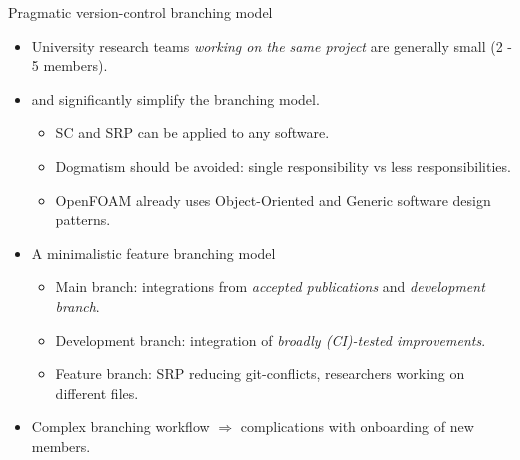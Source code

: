 \documentclass[
	ngerman,%
	aspectratio=169,%
	color={accentcolor=2d},
	logo=true,%
	colorframetitle=true,%
	]{tudabeamer}
\begin{document}
\begin{frame}{Pragmatic version-control branching model} 

	\vfill
	\begin{itemize}
		\item University research teams \emph{working on the same project} are generally small (2 - 5 members).
		\item \href{https://en.wikipedia.org/wiki/Separation_of_concerns}{} and \href{https://en.wikipedia.org/wiki/Single-responsibility_principle}{} significantly simplify the branching model. 
			\begin{itemize}
				\item SC and SRP can be applied to any software.
				\item Dogmatism should be avoided: single responsibility vs less responsibilities. 
				\item OpenFOAM already uses Object-Oriented and Generic software design patterns.  
			\end{itemize}
		\item A minimalistic feature branching model 
			\begin{itemize}
				\item Main branch: integrations from \emph{accepted publications} and \emph{development branch}. 
				\item Development branch: integration of \emph{broadly (CI)-tested improvements}. 
				\item Feature branch: SRP reducing git-conflicts, researchers working on different files.
			\end{itemize}
		\item Complex branching workflow $\Rightarrow$ complications with onboarding of new members.
	\end{itemize}

\end{frame}
\end{document}

